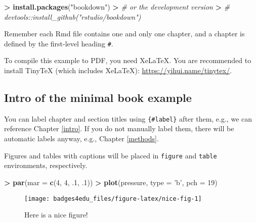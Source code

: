 \documentclass[]{book}
\newenvironment{Shaded}{\begin{snugshade}}{\end{snugshade}}
\newcommand{\KeywordTok}[1]{\textcolor[rgb]{0.13,0.29,0.53}{\textbf{#1}}}
\newcommand{\DataTypeTok}[1]{\textcolor[rgb]{0.13,0.29,0.53}{#1}}
\newcommand{\DecValTok}[1]{\textcolor[rgb]{0.00,0.00,0.81}{#1}}
\newcommand{\StringTok}[1]{\textcolor[rgb]{0.31,0.60,0.02}{#1}}
\newcommand{\CommentTok}[1]{\textcolor[rgb]{0.56,0.35,0.01}{\textit{#1}}}
\newcommand{\OperatorTok}[1]{\textcolor[rgb]{0.81,0.36,0.00}{\textbf{#1}}}
\newcommand{\ErrorTok}[1]{\textcolor[rgb]{0.64,0.00,0.00}{\textbf{#1}}}
\newcommand{\NormalTok}[1]{#1}
\theoremstyle{definition}
\theoremstyle{definition}
\theoremstyle{definition}
\theoremstyle{remark}
\begin{document}
\begin{Shaded}
\begin{Highlighting}[]
\OperatorTok{>}\StringTok{ }\KeywordTok{install.packages}\NormalTok{(}\StringTok{"bookdown"}\NormalTok{)}
\OperatorTok{>}\StringTok{ }\CommentTok{# or the development version}
\ErrorTok{>}\StringTok{ }\CommentTok{# devtools::install_github("rstudio/bookdown")}
\end{Highlighting}
\end{Shaded}

Remember each Rmd file contains one and only one chapter, and a chapter
is defined by the first-level heading \texttt{\#}.

To compile this example to PDF, you need XeLaTeX. You are recommended to
install TinyTeX (which includes XeLaTeX):
\url{https://yihui.name/tinytex/}.

\subsection{Intro of the minimal book
example}\label{intro-of-the-minimal-book-example}

You can label chapter and section titles using \texttt{\{\#label\}}
after them, e.g., we can reference Chapter \ref{intro}. If you do not
manually label them, there will be automatic labels anyway, e.g.,
Chapter \ref{methods}.

Figures and tables with captions will be placed in \texttt{figure} and
\texttt{table} environments, respectively.

\begin{Shaded}
\begin{Highlighting}[]
\OperatorTok{>}\StringTok{ }\KeywordTok{par}\NormalTok{(}\DataTypeTok{mar =} \KeywordTok{c}\NormalTok{(}\DecValTok{4}\NormalTok{, }\DecValTok{4}\NormalTok{, .}\DecValTok{1}\NormalTok{, .}\DecValTok{1}\NormalTok{))}
\OperatorTok{>}\StringTok{ }\KeywordTok{plot}\NormalTok{(pressure, }\DataTypeTok{type =} \StringTok{'b'}\NormalTok{, }\DataTypeTok{pch =} \DecValTok{19}\NormalTok{)}
\end{Highlighting}
\end{Shaded}

\begin{figure}

{\centering \texttt{[image: badges4edu\_files/figure-latex/nice-fig-1]} 

}

\caption{Here is a nice figure!}\label{fig:nice-fig}
\end{figure}
\end{document}
